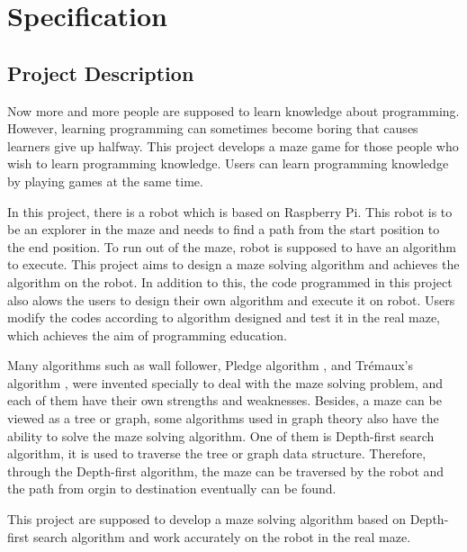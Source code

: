 \documentclass[11pt,times,oneside,openright,hardcopy]{eeereport}
\begin{document}

\mainmatter
{}

\chapter{Specification}\label{cpt:spec}

\section{Project Description}
Now more and more people are supposed to learn knowledge about programming. However, learning programming can sometimes become boring that causes learners give up halfway.
This project develops a maze game for those people who wish to learn programming knowledge. Users can learn programming knowledge by playing games at the same time.

In this project, there is a robot which is based on Raspberry Pi. This robot is to be an explorer in the maze and needs to find a path from the start position to the end position.
To run out of the maze, robot is supposed to have an algorithm to execute. This project aims to design a maze solving algorithm and achieves the algorithm on the robot.
In addition to this, the code programmed in this project also alows the users to design their own algorithm and execute it on robot. Users modify the codes according to algorithm designed and test it in the real maze, which achieves the aim of programming education.

Many algorithms such as wall follower, Pledge algorithm \cite{Klein:2011hi}, and Trémaux's algorithm \cite{Anonymous:2007ch}, were invented specially to deal with the maze solving problem, and each of them have their own strengths and weaknesses.
Besides, a maze can be viewed as a tree or graph, some algorithms used in graph theory also have the ability to solve the maze solving algorithm. One of them is Depth-first search algorithm, it is used to traverse the tree or graph data structure. Therefore, through the Depth-first algorithm, the maze can be traversed by the robot and the path from orgin to destination eventually can be found.

This project are supposed to develop a maze solving algorithm based on Depth-first search algorithm and work accurately on the robot in the real maze.
\end{document}
